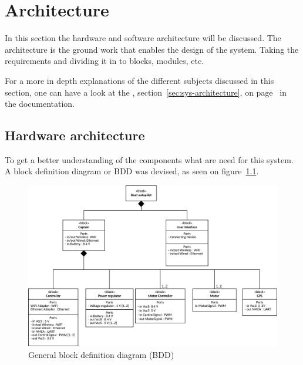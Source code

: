 \chapter{Architecture}

In this section the hardware and software architecture will be discussed. The architecture is the ground work that enables the design of the system. Taking the requirements and dividing it in to blocks, modules, etc.

For a more in depth explanations of the different subjects discussed in this section, one can have a look at the , section~\ref{sec:sys-architecture}, on page~\pageref{sec:sys-architecture} in the documentation.

\section{Hardware architecture}
To get a better understanding of the components what are need for this system. A block definition diagram or BDD was devised, as seen on figure~\ref{fig:generalbdd}. 

\begin{figure}[H]
\centering
\includegraphics[width=1\linewidth]{../Appendix/Project/Dokumentation/Images/System_architecture/General_BDD}
\caption{General block definition diagram (BDD)}
\label{fig:generalbdd}
\end{figure}

